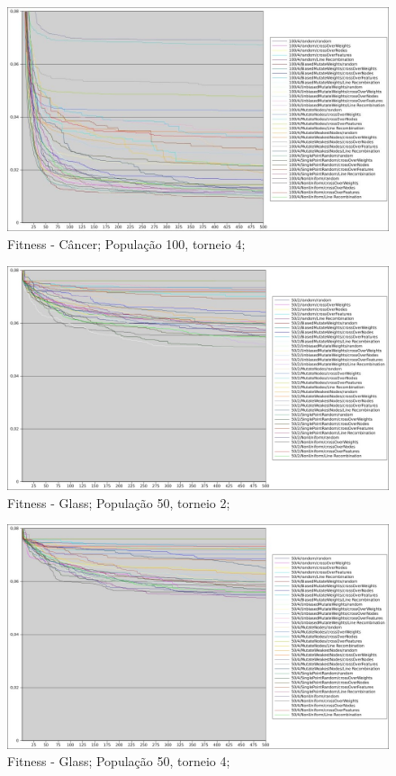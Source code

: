 \documentclass[12pt]{article}
\begin{document}
\begin{figure}[hbp]
\center
\includegraphics[scale=0.34, keepaspectratio]{cancer_100_4_converted.jpg} 
\caption{Fitness - Câncer; População 100, torneio 4;}
\label{fig:can100.4}
\end{figure}

\begin{figure}[htp]
\center
\includegraphics[scale=0.34, keepaspectratio]{glass_50_2.jpg} 
\caption{Fitness - Glass; População 50, torneio 2;}
\label{fig:gla50.2}
\end{figure}

\begin{figure}[hbp]
\center
\includegraphics[scale=0.34, keepaspectratio]{glass_50_4.jpg} 
\caption{Fitness - Glass; População 50, torneio 4;}
\label{fig:gla50.4}
\end{figure}
\end{document}
